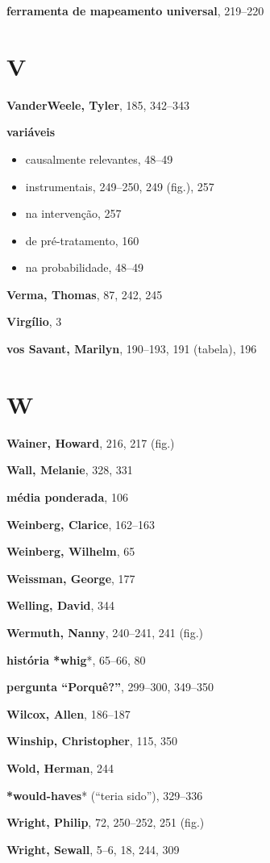 \documentclass[11pt,a5paper,twoside]{book}
\begin{document}
\textbf{ferramenta de mapeamento universal}, 219–220

\section{V}
\textbf{VanderWeele, Tyler}, 185, 342–343

\textbf{variáveis}

\begin{itemize}
\item causalmente relevantes, 48–49
\item instrumentais, 249–250, 249 (fig.), 257
\item na intervenção, 257
\item de pré-tratamento, 160
\item na probabilidade, 48–49
\end{itemize}
\textbf{Verma, Thomas}, 87, 242, 245

\textbf{Virgílio}, 3

\textbf{vos Savant, Marilyn}, 190–193, 191 (tabela), 196

\section{W}
\textbf{Wainer, Howard}, 216, 217 (fig.)

\textbf{Wall, Melanie}, 328, 331

\textbf{média ponderada}, 106

\textbf{Weinberg, Clarice}, 162–163

\textbf{Weinberg, Wilhelm}, 65

\textbf{Weissman, George}, 177

\textbf{Welling, David}, 344

\textbf{Wermuth, Nanny}, 240–241, 241 (fig.)

\textbf{história *whig}*, 65–66, 80

\textbf{pergunta “Porquê?”}, 299–300, 349–350

\textbf{Wilcox, Allen}, 186–187

\textbf{Winship, Christopher}, 115, 350

\textbf{Wold, Herman}, 244

\textbf{*would-haves}* (“teria sido”), 329–336

\textbf{Wright, Philip}, 72, 250–252, 251 (fig.)

\textbf{Wright, Sewall}, 5–6, 18, 244, 309
\end{document}
